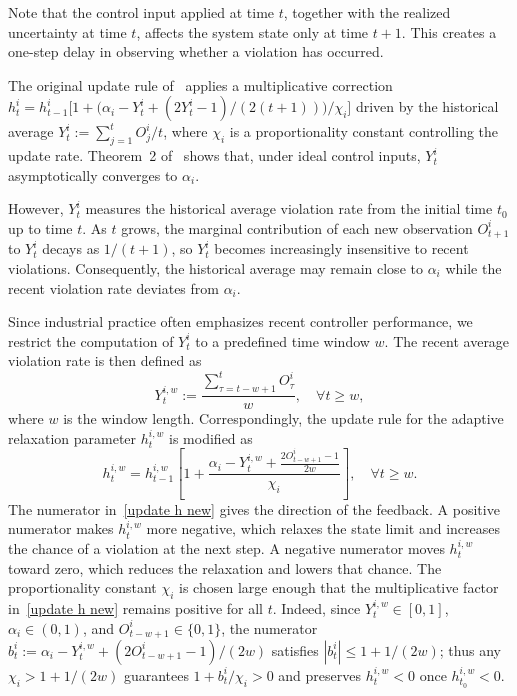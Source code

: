\documentclass[a4paper,fleqn]{cas-dc}
\theoremstyle{plain}
\theoremstyle{remark}
\theoremstyle{plain}
\begin{document}
Note that the control input applied at time $t$, together with the realized uncertainty at time $t$, affects the system state only at time $t+1$. This creates a one-step delay in observing whether a violation has occurred.

The original update rule of~\cite{ghosh2025_adaptive_relaxation_ccsmpc} applies a multiplicative correction $h_t^i = h_{t-1}^i\big[1+\big(\alpha_i - Y_t^i + (2Y_t^i-1)/(2(t+1))\big)/\chi_i\big]$ driven by the historical average $Y_t^i:=\sum_{j=1}^{t}O_j^i/t$, where $\chi_i$ is a proportionality constant controlling the update rate. Theorem~2 of~\cite{ghosh2025_adaptive_relaxation_ccsmpc} shows that, under ideal control inputs, $Y_t^i$ asymptotically converges to $\alpha_i$.

However, $Y_t^i$ measures the historical average violation rate from the initial time $t_0$ up to time $t$. As $t$ grows, the marginal contribution of each new observation $O_{t+1}^i$ to $Y_t^i$ decays as $1/(t+1)$, so $Y_t^i$ becomes increasingly insensitive to recent violations. Consequently, the historical average may remain close to $\alpha_i$ while the recent violation rate deviates from $\alpha_i$.

Since industrial practice often emphasizes recent controller performance, we restrict the computation of $Y_t^i$ to a predefined time window $w$. The recent average violation rate is then defined as
\begin{equation}\label{New Y}
    Y_t^{i,w} := \frac{\sum_{\tau = t-w+1}^{t}O_{\tau}^i}{w}, \quad \forall t\ge w,
\end{equation}
where $w$ is the window length. Correspondingly, the update rule for the adaptive relaxation parameter $h_t^{i,w}$ is modified as
\begin{equation}\label{update h new}
h^{i,w}_{t} = h^{i,w}_{t-1}\left[1+\frac{\alpha_i - Y_{t}^{i,w} + \frac{2O^{i}_{t-w+1}-1}{2w}}{\chi_i}\right], \quad \forall t\ge w.
\end{equation}
The numerator in~\eqref{update h new} gives the direction of the feedback. A positive numerator makes $h_t^{i,w}$ more negative, which relaxes the state limit and increases the chance of a violation at the next step. A negative numerator moves $h_t^{i,w}$ toward zero, which reduces the relaxation and lowers that chance.
The proportionality constant $\chi_i$ is chosen large enough that the multiplicative factor in~\eqref{update h new} remains positive for all $t$. Indeed, since $Y_t^{i,w}\in[0,1]$, $\alpha_i\in(0,1)$, and $O_{t-w+1}^i\in\{0,1\}$, the numerator $b_t^i:=\alpha_i-Y_t^{i,w}+(2O_{t-w+1}^i-1)/(2w)$ satisfies $|b_t^i|\le 1+1/(2w)$; thus any $\chi_i>1+1/(2w)$ guarantees $1+b_t^i/\chi_i>0$ and preserves $h_t^{i,w}<0$ once $h_{t_0}^{i,w}<0$.
\end{document}
